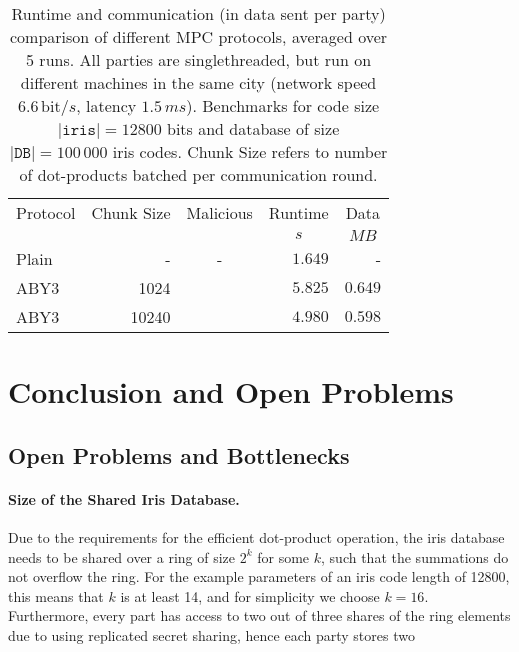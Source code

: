 \documentclass[a4paper,11pt,
]{article}
\newcommand{\xmark}{\ding{55}}%
\begin{document}
\begin{table}[ht]
    \centering
    \caption{Runtime and communication (in data sent per party) comparison of different MPC protocols, averaged over 5 runs. All parties are singlethreaded, but run on different machines in the same city (network speed $6.6\,\text{bit}/s$, latency $1.5\,ms$). Benchmarks for code size $|\texttt{iris}| = 12800$ bits and database of size $|\texttt{DB}| = 100\,000$ iris codes. Chunk Size refers to number of dot-products batched per communication round.}
    \label{tab::bench_network}
    \begin{tabular}{lrcrr}
        \toprule
        \multicolumn{1}{c}{Protocol} & \multicolumn{1}{c}{Chunk Size} & \multicolumn{1}{c}{Malicious} & \multicolumn{1}{c}{Runtime} & \multicolumn{1}{c}{Data} \\
                                     &                                &                               & \multicolumn{1}{c}{$s$}     & \multicolumn{1}{c}{$MB$} \\
        \midrule
        Plain                        & -                              & -                             & $1.649$                     & -                        \\
        ABY3                         & 1024                           & \xmark                        & $5.825$                     & $0.649$                  \\
        ABY3                         & 10240                          & \xmark                        & $4.980$                     & $0.598$                  \\
        \bottomrule
    \end{tabular}
\end{table}

\section{Conclusion and Open Problems}

\subsection{Open Problems and Bottlenecks}

\paragraph{Size of the Shared Iris Database.}
Due to the requirements for the efficient dot-product operation, the iris database needs to be shared over a ring of size $2^k$ for some $k$, such that the summations do not overflow the ring.
For the example parameters of an iris code length of 12800, this means that $k$ is at least 14, and for simplicity we choose $k=16$.
Furthermore, every part has access to two out of three shares of the ring elements due to using replicated secret sharing, hence each party stores two
\end{document}
